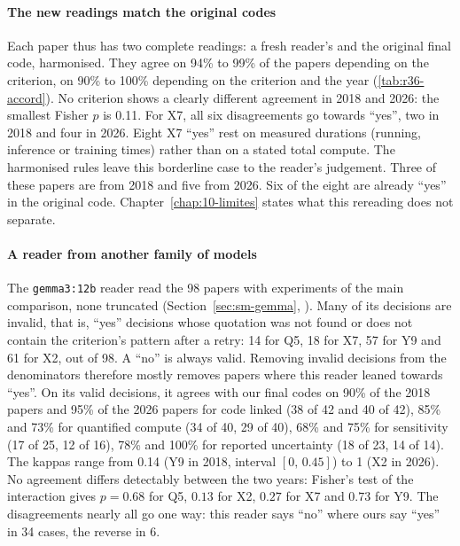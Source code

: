 \paragraph{The new readings match the original codes}
Each paper thus has two complete readings: a fresh reader's and the original final code, harmonised.
They agree on 94\% to 99\% of the papers depending on the criterion, on 90\% to 100\% depending on the
criterion and the year (\cref{tab:r36-accord}). No criterion shows a clearly different agreement in
2018 and 2026: the smallest Fisher $p$ is 0.11. For X7, all six disagreements go towards
\enquote{yes}, two in 2018 and four in 2026. Eight X7 \enquote{yes} rest on measured durations
(running, inference or training times) rather than on a stated total compute. The harmonised rules
leave this borderline case to the reader's judgement. Three of these papers are from 2018 and five from
2026. Six of the eight are already \enquote{yes} in the original code.
Chapter~\ref{chap:10-limites} states what this rereading does not separate.


\paragraph{A reader from another family of models}\label{sec:sr-gemma}
The \texttt{gemma3:12b} reader read the 98 papers with experiments of the main comparison, none
truncated (Section~\ref{sec:sm-gemma}, ). Many of its decisions are
invalid, that is, \enquote{yes} decisions whose quotation was not found or does not contain the
criterion's pattern after a retry: 14 for Q5, 18 for X7, 57 for Y9 and 61 for X2, out of 98. A
\enquote{no} is always valid. Removing invalid decisions from the denominators therefore mostly removes
papers where this reader leaned towards \enquote{yes}. On its valid decisions, it agrees with our final
codes on 90\% of the 2018 papers and 95\% of the 2026 papers for code linked (38 of 42 and 40 of 42),
85\% and 73\% for quantified compute (34 of 40, 29 of 40), 68\% and 75\% for sensitivity (17 of 25,
12 of 16), 78\% and 100\% for reported uncertainty (18 of 23, 14 of 14). The kappas range from 0.14
(Y9 in 2018, interval $[0,\,0.45]$) to 1 (X2 in 2026). No agreement differs detectably between the
two years: Fisher's test of the interaction gives $p = 0.68$ for Q5, $0.13$ for X2, $0.27$ for X7 and
$0.73$ for Y9. The disagreements nearly all go one way: this reader says \enquote{no} where ours say
\enquote{yes} in 34 cases, the reverse in 6.

